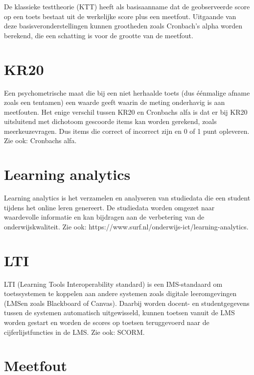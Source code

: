 \documentclass[
  letterpaper,
  DIV=11,
  numbers=noendperiod]{scrreprt}
\begin{document}
De klassieke testtheorie (KTT) heeft als basisaanname dat de
geobserveerde score op een toets bestaat uit de werkelijke score plus
een meetfout. Uitgaande van deze basisveronderstellingen kunnen
grootheden zoals Cronbach's alpha worden berekend, die een schatting is
voor de grootte van de meetfout.

\hypertarget{kr20}{%
\section{KR20}\label{kr20}}

Een psychometrische maat die bij een niet herhaalde toets (dus éénmalige
afname zoals een tentamen) een waarde geeft waarin de meting onderhavig
is aan meetfouten. Het enige verschil tussen KR20 en Cronbachs alfa is
dat er bij KR20 uitsluitend met dichotoom gescoorde items kan worden
gerekend, zoals meerkeuzevragen. Dus items die correct of incorrect zijn
en 0 of 1 punt opleveren. Zie ook: Cronbachs alfa.

\hypertarget{learning-analytics}{%
\section{Learning analytics}\label{learning-analytics}}

Learning analytics is het verzamelen en analyseren van studiedata die
een student tijdens het online leren genereert. De studiedata worden
omgezet naar waardevolle informatie en kan bijdragen aan de verbetering
van de onderwijskwaliteit. Zie ook:
https://www.surf.nl/onderwijs-ict/learning-analytics.

\hypertarget{lti}{%
\section{LTI}\label{lti}}

LTI (Learning Tools Interoperability standard) is een IMS-standaard om
toetssystemen te koppelen aan andere systemen zoals digitale
leeromgevingen (LMSen zoals Blackboard of Canvas). Daarbij worden
docent- en studentgegevens tussen de systemen automatisch uitgewisseld,
kunnen toetsen vanuit de LMS worden gestart en worden de scores op
toetsen teruggevoerd naar de cijferlijstfuncties in de LMS. Zie ook:
SCORM.

\hypertarget{meetfout}{%
\section{Meetfout}\label{meetfout}}
\end{document}
